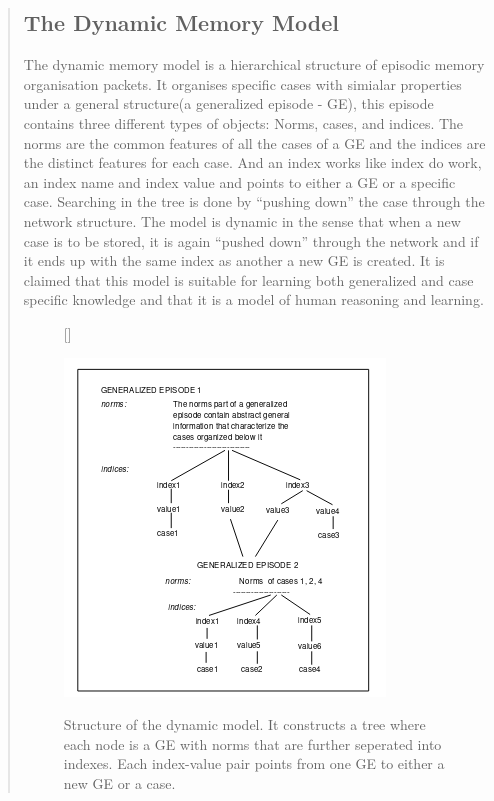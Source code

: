 \documentclass[11pt, letterpaper]{report}
\numberwithin{equation}{section}
\begin{document}
\begin{quote}
\subsection{The Dynamic Memory Model} \label{subsec:dynamic_model}
The dynamic memory model is a hierarchical structure of episodic memory
organisation packets. It organises specific cases with simialar properties under
a general structure(a generalized episode - GE), this episode contains three
different types of objects: Norms, cases, and indices. The norms are the common
features of all the cases of a GE and the indices are the distinct features for
each case. And an index works like index do work, an index name and index value
and points to either a GE or a specific case. Searching in the tree is done by
``pushing down'' the case through the network structure. The model is
dynamic in the sense that when a new case is to be stored, it is again ``pushed
down'' through the network and if it ends up with the same index as another a
new GE is created. It is claimed that this model is suitable for learning both
generalized and case specific knowledge and that it is a model of human
reasoning and learning.

\begin{figure}
  [\FBwidth]
  {\caption[Structure of the Dynamic Memory Model]{Structure of the dynamic
    model. It constructs a tree where each node is a GE with norms that are
    further seperated into indexes. Each index-value pair points from one GE to
    either a new GE or a case.}
  \label{fig:dynamicmodel}}
  {\includegraphics{dynamic_model}}


\end{figure}
\end{quote}
\end{document}
